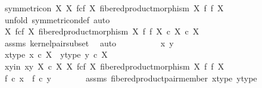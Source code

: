 \begin{isabellebody}
\ {\isachardoublequoteopen}symmetric{\isacharunderscore}{\kern0pt}on\ X\ {\isacharparenleft}{\kern0pt}X\ \isactrlbsub f\isactrlesub {\isasymtimes}\isactrlsub c\isactrlbsub f\isactrlesub \ X{\isacharcomma}{\kern0pt}\ fibered{\isacharunderscore}{\kern0pt}product{\isacharunderscore}{\kern0pt}morphism\ X\ f\ f\ X{\isacharparenright}{\kern0pt}{\isachardoublequoteclose}\isanewline
\ \ \isamarkupfalse%
\ {\isacharparenleft}{\kern0pt}unfold\ symmetric{\isacharunderscore}{\kern0pt}on{\isacharunderscore}{\kern0pt}def{\isacharcomma}{\kern0pt}\ auto{\isacharparenright}{\kern0pt}\isanewline
\ \ \ \ \isamarkupfalse%
\ {\isachardoublequoteopen}{\isacharparenleft}{\kern0pt}X\ \isactrlbsub f\isactrlesub {\isasymtimes}\isactrlsub c\isactrlbsub f\isactrlesub \ X{\isacharcomma}{\kern0pt}\ fibered{\isacharunderscore}{\kern0pt}product{\isacharunderscore}{\kern0pt}morphism\ X\ f\ f\ X{\isacharparenright}{\kern0pt}\ {\isasymsubseteq}\isactrlsub c\ X\ {\isasymtimes}\isactrlsub c\ X{\isachardoublequoteclose}\isanewline
\ \ \ \ \ \ \isamarkupfalse%
\ assms\ kernel{\isacharunderscore}{\kern0pt}pair{\isacharunderscore}{\kern0pt}subset\ \isamarkupfalse%
\ auto\isanewline
\ \ \isamarkupfalse%
\ \isanewline
\ \ \ \ \isamarkupfalse%
\ x\ y\isanewline
\ \ \ \ \isamarkupfalse%
\ x{\isacharunderscore}{\kern0pt}type{\isacharcolon}{\kern0pt}\ {\isachardoublequoteopen}x\ {\isasymin}\isactrlsub c\ X{\isachardoublequoteclose}\ \ y{\isacharunderscore}{\kern0pt}type{\isacharcolon}{\kern0pt}\ {\isachardoublequoteopen}y\ {\isasymin}\isactrlsub c\ X{\isachardoublequoteclose}\isanewline
\ \ \ \ \isamarkupfalse%
\ xy{\isacharunderscore}{\kern0pt}in{\isacharcolon}{\kern0pt}\ {\isachardoublequoteopen}{\isasymlangle}x{\isacharcomma}{\kern0pt}y{\isasymrangle}\ {\isasymin}\isactrlbsub X\ {\isasymtimes}\isactrlsub c\ X\isactrlesub \ {\isacharparenleft}{\kern0pt}X\ \isactrlbsub f\isactrlesub {\isasymtimes}\isactrlsub c\isactrlbsub f\isactrlesub \ X{\isacharcomma}{\kern0pt}\ fibered{\isacharunderscore}{\kern0pt}product{\isacharunderscore}{\kern0pt}morphism\ X\ f\ f\ X{\isacharparenright}{\kern0pt}{\isachardoublequoteclose}\isanewline
\ \ \ \ \isamarkupfalse%
\ \isamarkupfalse%
\ {\isachardoublequoteopen}f\ {\isasymcirc}\isactrlsub c\ x\ {\isacharequal}{\kern0pt}\ f\ {\isasymcirc}\isactrlsub c\ y{\isachardoublequoteclose}\isanewline
\ \ \ \ \ \ \isamarkupfalse%
\ assms\ fibered{\isacharunderscore}{\kern0pt}product{\isacharunderscore}{\kern0pt}pair{\isacharunderscore}{\kern0pt}member\ x{\isacharunderscore}{\kern0pt}type\ y{\isacharunderscore}{\kern0pt}type\ \isamarkupfalse%

\end{isabellebody}
